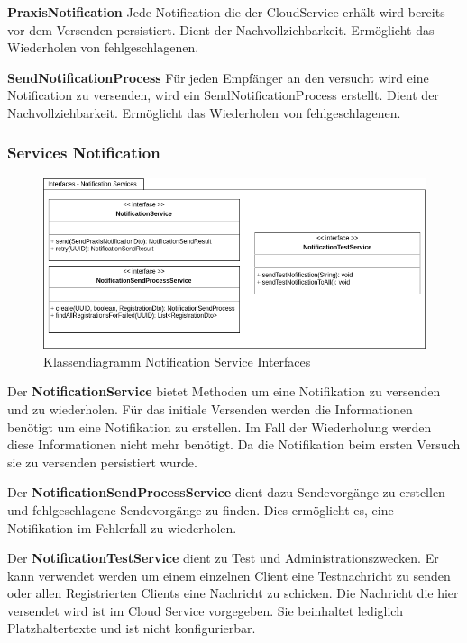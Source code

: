 \textbf{PraxisNotification}
Jede Notification die der CloudService erhält wird bereits vor dem Versenden persistiert.
Dient der Nachvollziehbarkeit.
Ermöglicht das Wiederholen von fehlgeschlagenen.

\textbf{SendNotificationProcess}
Für jeden Empfänger an den versucht wird eine Notification zu versenden, wird ein SendNotificationProcess erstellt.
Dient der Nachvollziehbarkeit.
Ermöglicht das Wiederholen von fehlgeschlagenen.

\clearpage

\subsubsection*{Services Notification}

\begin{figure}[h]
    \centering
    \begin{minipage}[b]{0.9\textwidth}
        \includegraphics[width=\textwidth]{graphics/Class_Notification_Services}
        \caption{Klassendiagramm Notification Service Interfaces}
    \end{minipage}
\end{figure}


Der \textbf{NotificationService} bietet Methoden um eine Notifikation zu versenden und zu wiederholen.
Für das initiale Versenden werden die Informationen benötigt um eine Notifikation zu erstellen.
Im Fall der Wiederholung werden diese Informationen nicht mehr benötigt.
Da die Notifikation beim ersten Versuch sie zu versenden persistiert wurde.

Der \textbf{NotificationSendProcessService} dient dazu Sendevorgänge zu erstellen und fehlgeschlagene Sendevorgänge zu finden.
Dies ermöglicht es, eine Notifikation im Fehlerfall zu wiederholen.

Der \textbf{NotificationTestService} dient zu Test und Administrationszwecken.
Er kann verwendet werden um einem einzelnen Client eine Testnachricht zu senden oder allen Registrierten Clients eine Nachricht zu schicken.
Die Nachricht die hier versendet wird ist im Cloud Service vorgegeben.
Sie beinhaltet lediglich Platzhaltertexte und ist nicht konfigurierbar.

